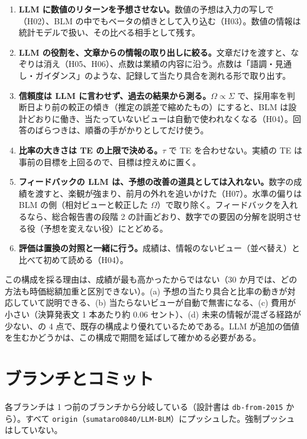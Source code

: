 \documentclass[xelatex,ja=standard,jafont=haranoaji,a4paper,10pt,openany]{bxjsreport}
\newcommand{\code}[1]{\texttt{#1}}
\begin{document}
\begin{enumerate}
\item \textbf{LLM に数値のリターンを予想させない。}数値の予想は入力の写しで（H02）、BLM の中でもベータの傾きとして入り込む（H03）。数値の情報は統計モデルで扱い、その比べる相手として残す。
\item \textbf{LLM の役割を、文章からの情報の取り出しに絞る。}文章だけを渡すと、なぞりは消え（H05、H06）、点数は業績の内容に沿う。点数は「語調・見通し・ガイダンス」のような、記録して当たり具合を測れる形で取り出す。
\item \textbf{信頼度は LLM に言わせず、過去の結果から測る。}$\Omega\propto\Sigma$ で、採用率を判断日より前の較正の傾き（推定の誤差で縮めたもの）にすると、BLM は設計どおりに働き、当たっていないビューは自動で使われなくなる（H04）。回答のばらつきは、順番の手がかりとしてだけ使う。
\item \textbf{比率の大きさは TE の上限で決める。}$\tau$ で TE を合わせない。実績の TE は事前の目標を上回るので、目標は控えめに置く。
\item \textbf{フィードバックの LLM は、予想の改善の道具としては入れない。}数字の成績を渡すと、楽観が強まり、前月の外れを追いかけた（H07）。水準の偏りは BLM の側（相対ビューと較正した $\Omega$）で取り除く。フィードバックを入れるなら、総合報告書の段階 2 の計画どおり、数字での要因の分解を説明させる役（予想を変えない役）にとどめる。
\item \textbf{評価は置換の対照と一緒に行う。}成績は、情報のないビュー（並べ替え）と比べて初めて読める（H04）。
\end{enumerate}

この構成を採る理由は、成績が最も高かったからではない（30 か月では、どの方法も時価総額加重と区別できない）。(a) 予想の当たり具合と比率の動きが対応していて説明できる、(b) 当たらないビューが自動で無害になる、(c) 費用が小さい（決算発表文 1 本あたり約 0.06 セント）、(d) 未来の情報が混ざる経路が少ない、の 4 点で、既存の構成より優れているためである。LLM が追加の価値を生むかどうかは、この構成で期間を延ばして確かめる必要がある。

\appendix
\chapter{ブランチとコミット}\label{app:branches}

各ブランチは 1 つ前のブランチから分岐している（設計書は \code{db-from-2015} から）。すべて \code{origin}（\code{sumataro0840/LLM-BLM}）にプッシュした。強制プッシュはしていない。
\end{document}
